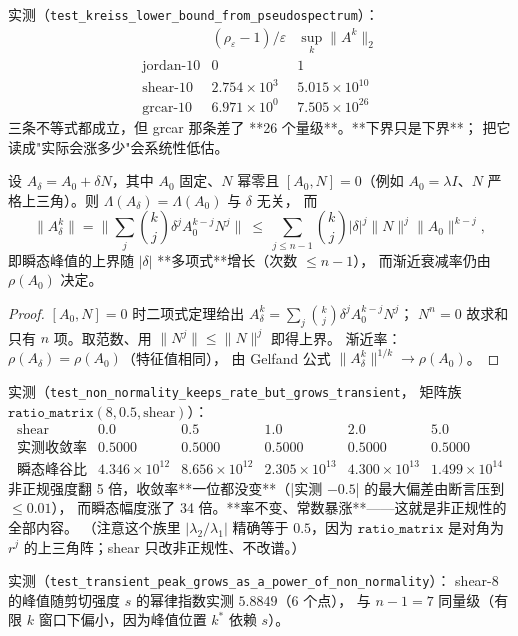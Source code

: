 实测（\texttt{test\_kreiss\_lower\_bound\_from\_pseudospectrum}）：
\[
\begin{array}{c|cc}
 & (\rho_\varepsilon-1)/\varepsilon & \sup_k\|A^k\|_2\\\hline
\text{jordan-10} & 0 & 1\\
\text{shear-10}  & 2.754\times10^{3} & 5.015\times10^{10}\\
\text{grcar-10}  & 6.971\times10^{0} & 7.505\times10^{26}
\end{array}
\]
三条不等式都成立，但 grcar 那条差了 **26 个量级**。**下界只是下界**；
把它读成"实际会涨多少"会系统性低估。

\begin{theorem}
\label{thm:nonnormal}
设 $A_\delta=A_0+\delta N$，其中 $A_0$ 固定、$N$ 幂零且 $[A_0,N]=0$（例如
$A_0=\lambda I$、$N$ 严格上三角）。则 $\Lambda(A_\delta)=\Lambda(A_0)$ 与 $\delta$ 无关，
而
\[
  \|A_\delta^k\|=\Big\|\sum_{j}\binom{k}{j}\delta^jA_0^{k-j}N^j\Big\|
  \ \le\ \sum_{j\le n-1}\binom{k}{j}|\delta|^j\|N\|^j\|A_0\|^{k-j},
\]
即瞬态峰值的上界随 $|\delta|$ **多项式**增长（次数 $\le n-1$），
而渐近衰减率仍由 $\rho(A_0)$ 决定。
\end{theorem}

\begin{proof}
$[A_0,N]=0$ 时二项式定理给出 $A_\delta^k=\sum_j\binom{k}{j}\delta^jA_0^{k-j}N^j$；
$N^n=0$ 故求和只有 $n$ 项。取范数、用 $\|N^j\|\le\|N\|^j$ 即得上界。
渐近率：$\rho(A_\delta)=\rho(A_0)$（特征值相同），
由 Gelfand 公式 $\|A_\delta^k\|^{1/k}\to\rho(A_0)$。
\end{proof}

实测（\texttt{test\_non\_normality\_keeps\_rate\_but\_grows\_transient}，
矩阵族 $\texttt{ratio\_matrix}(8,0.5,\text{shear})$）：
\[
\begin{array}{c|ccccc}
\text{shear} & 0.0 & 0.5 & 1.0 & 2.0 & 5.0\\\hline
\text{实测收敛率} & 0.5000 & 0.5000 & 0.5000 & 0.5000 & 0.5000\\
\text{瞬态峰谷比} & 4.346\times10^{12} & 8.656\times10^{12} & 2.305\times10^{13}
& 4.300\times10^{13} & 1.499\times10^{14}
\end{array}
\]
非正规强度翻 5 倍，收敛率**一位都没变**（|实测 $-0.5$| 的最大偏差由断言压到 $\le0.01$），
而瞬态幅度涨了 34 倍。**率不变、常数暴涨**——这就是非正规性的全部内容。
（注意这个族里 $|\lambda_2/\lambda_1|$ 精确等于 $0.5$，因为 $\texttt{ratio\_matrix}$
是对角为 $r^j$ 的上三角阵；shear 只改非正规性、不改谱。）

实测（\texttt{test\_transient\_peak\_grows\_as\_a\_power\_of\_non\_normality}）：
shear-8 的峰值随剪切强度 $s$ 的幂律指数实测 $5.8849$（6 个点），
与 $n-1=7$ 同量级（有限 $k$ 窗口下偏小，因为峰值位置 $k^*$ 依赖 $s$）。

